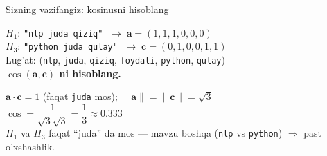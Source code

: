 \documentclass[aspectratio=169,11pt]{beamer}
\begin{document}
\begin{frame}{Sizning vazifangiz: kosinusni hisoblang}
  \begin{tcolorbox}[warnbox,title=Savol --- 2 daqiqa]
    \small
    $H_1$: \texttt{"nlp juda qiziq"}
    $\;\to\;\mathbf{a}=(1,1,1,0,0,0)$\\[3pt]
    $H_3$: \texttt{"python juda qulay"}
    $\;\to\;\mathbf{c}=(0,1,0,0,1,1)$\\[3pt]
    {\scriptsize\color{halfgray}Lug'at: (\texttt{nlp}, \texttt{juda},
    \texttt{qiziq}, \texttt{foydali}, \texttt{python}, \texttt{qulay})}\\[5pt]
    \textbf{\large $\cos(\mathbf{a},\mathbf{c})$ ni hisoblang.}
  \end{tcolorbox}
  \pause
  \begin{tcolorbox}[okbox,title=Javob]
    \small
    $\mathbf{a}\cdot\mathbf{c} = 1$ (faqat \texttt{juda} mos);\quad
    $\lVert\mathbf{a}\rVert = \lVert\mathbf{c}\rVert = \sqrt{3}$\\[3pt]
    $\cos = \dfrac{1}{\sqrt{3}\sqrt{3}} = \dfrac{1}{3} \approx \mathbf{0.333}$\\[3pt]
    $H_1$ va $H_3$ faqat ``juda'' da mos --- mavzu boshqa
    (\texttt{nlp} vs \texttt{python}) $\Rightarrow$ past o'xshashlik.
  \end{tcolorbox}
\end{frame}
\end{document}
